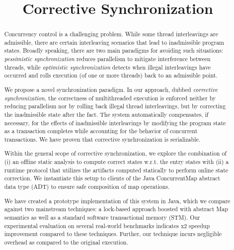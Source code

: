 \documentclass[preprint,nocopyrightspace]{sigplanconf}
\theoremstyle{exampstyle}\newtheorem{theorem}{Theorem}[section]
\theoremstyle{exampstyle}\newtheorem{lemma}[theorem]{Lemma}
\theoremstyle{exampstyle}\newtheorem{proposition}[theorem]{Proposition}
\theoremstyle{exampstyle}\newtheorem{corollary}[theorem]{Corollary}
\theoremstyle{exampstyle}\newtheorem{definition}{Definition}[section]
\theoremstyle{exampstyle}\newtheorem{parameter}{Parameter}[section]
\theoremstyle{exampstyle}\newtheorem{property}{Property}[section]
\theoremstyle{exampstyle}\newtheorem{example}[equation]{Example}
\theoremstyle{exampstyle}\newtheorem{algorithm}[theorem]{Algorithm}
\begin{document}
\title{Corrective Synchronization}



\authorinfo{}{}{}
\maketitle

\begin{abstract}
Concurrency control is a challenging problem. While some thread interleavings are admissible, there are certain interleaving scenarios that lead to inadmissible program states. Broadly speaking, there are two main paradigms for avoiding such situations: \emph{pessimistic synchronization} reduces parallelism to mitigate interference between threads, while \emph{optimistic synchronization} detects when illegal interleavings have occurred and rolls execution (of one or more threads) back to an admissible point.

We propose a novel synchronization paradigm. In our approach, dubbed \emph{corrective synchronization}, the correctness of multithreaded execution is enforced neither by reducing parallelism nor by rolling back illegal thread interleavings, but by correcting the inadmissible state after the fact. The system automatically compensates, if necessary, for the effects of inadmissible interleavings by modifying the program state as a transaction completes while accounting for the behavior of concurrent transactions. We have proven that corrective synchronization is serializable.

Within the general scope of corrective synchronization, we explore the combination of (i) an offline static analysis to compute correct states w.r.t. the entry states with (ii) a runtime protocol that utilizes the artifacts computed statically to perform online state correction. We instantiate this setup to clients of the Java {\sf ConcurrentMap} abstract data type (ADT) to ensure safe composition of map operations.

We have created a prototype implementation of this system in Java, which we compare against two mainstream techniques: a lock-based approach boosted with abstract {\sf Map} semantics as well as a standard software transactional memory (STM). Our experimental evaluation on several real-world benchmarks indicates x2 speedup improvement compared to these techniques. Further, our technique incurs negligible overhead as compared to the original execution.
\end{abstract}
\end{document}
